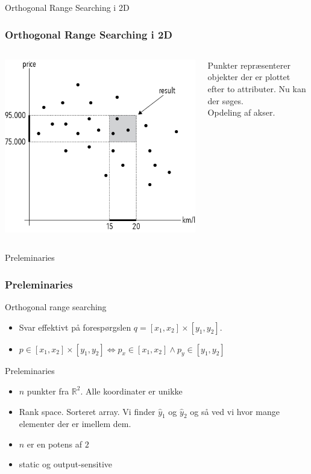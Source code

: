 \documentclass[pdf]{beamer}
\begin{document}
\begin{frame}{Orthogonal Range Searching i 2D}
  \frametitle{Orthogonal Range Searching i 2D}
  \begin{columns}
    \begin{center}
      \includegraphics[scale=0.8]{pictures/introduction.png}
    \end{center}
    Punkter repræsenterer objekter der er plottet efter to attributer. Nu kan der søges.\\

    Opdeling af akser.


  \end{columns}

\end{frame}

\begin{frame}{Preleminaries}
  \frametitle{Preleminaries}
  Orthogonal range searching
  \begin{itemize}
    \item Svar effektivt på forespørgslen $q = [x_1, x_2] \times [y_1, y_2]$.
    \item $p \in [x_1, x_2] \times [y_1, y_2] \Leftrightarrow p_x \in [x_1, x_2] \wedge p_y \in [y_1, y_2]$
  \end{itemize}

  Preleminaries
  \begin{itemize}

    \item $n$ punkter fra $\mathbb{R}^2$. Alle koordinater er unikke
    \item Rank space. Sorteret array. Vi finder $\hat{y}_1$ og $\hat{y}_2$ og så ved vi hvor mange elementer der er imellem dem.
    \item $n$ er en potens af $2$
    \item static og output-sensitive
  \end{itemize}
\end{frame}
\end{document}

